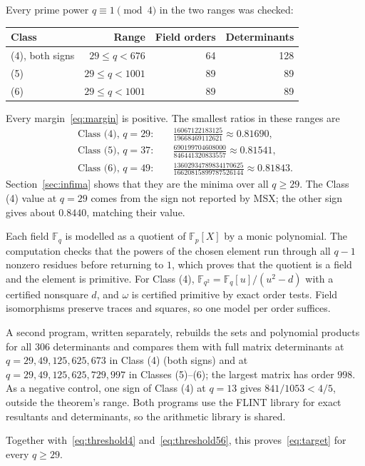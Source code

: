 \documentclass[11pt]{article}
\newcommand{\F}{\mathbb F}
\begin{document}
Every prime power $q\equiv1\pmod4$ in the two ranges was checked:
\begin{center}
\begin{tabular}{@{}lrrr@{}}
\toprule
Class & Range & Field orders & Determinants\\
\midrule
(4), both signs & $29\le q<676$ & 64 & 128\\
(5) & $29\le q<1001$ & 89 & 89\\
(6) & $29\le q<1001$ & 89 & 89\\
\bottomrule
\end{tabular}
\end{center}
Every margin~\eqref{eq:margin} is positive. The smallest ratios in these
ranges are
\begin{align*}
 \text{Class (4), }q=29:&\quad
   \tfrac{16067122183125}{19668469112621}\approx0.81690,\\
 \text{Class (5), }q=37:&\quad
   \tfrac{690199704608000}{846441320833557}\approx0.81541,\\
 \text{Class (6), }q=49:&\quad
   \tfrac{13602934789834170625}{16620815899787526144}\approx0.81843.
\end{align*}
Section~\ref{sec:infima} shows that they are the minima over all $q\ge29$.
The Class (4) value at $q=29$ comes from the sign not reported by MSX; the
other sign gives about $0.8440$, matching their value.

Each field $\F_q$ is modelled as a quotient of $\F_p[X]$ by a monic
polynomial. The computation checks that the powers of the chosen element
run through all $q-1$ nonzero residues before returning to $1$, which
proves that the quotient is a field and the element is primitive. For
Class (4), $\F_{q^2}=\F_q[u]/(u^2-d)$ with a certified nonsquare $d$, and
$\omega$ is certified primitive by exact order tests. Field isomorphisms
preserve traces and squares, so one model per order suffices.

A second program, written separately, rebuilds the sets and polynomial
products for all 306 determinants and compares them with full matrix
determinants at $q=29,49,125,625,673$ in Class (4) (both signs) and at
$q=29,49,125,625,729,997$ in Classes (5)--(6); the largest matrix has
order $998$. As a negative control, one sign of Class (4) at $q=13$ gives
$841/1053<4/5$, outside the theorem's range. Both programs use the FLINT
library for exact resultants and determinants, so the arithmetic library
is shared.

Together with~\eqref{eq:threshold4} and~\eqref{eq:threshold56}, this
proves~\eqref{eq:target} for every $q\ge29$.
\end{document}
